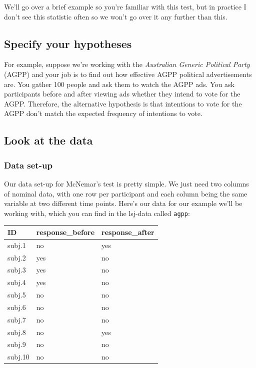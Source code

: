 \documentclass[
]{book}
\begin{document}
We'll go over a brief example so you're familiar with this test, but in practice I don't see this statistic often so we won't go over it any further than this.

\hypertarget{specify-your-hypotheses-3}{%
\subsection{Specify your hypotheses}\label{specify-your-hypotheses-3}}

For example, suppose we're working with the \emph{Australian Generic Political Party} (AGPP) and your job is to find out how effective AGPP political advertisements are. You gather 100 people and ask them to watch the AGPP ads. You ask participants before and after viewing ads whether they intend to vote for the AGPP. Therefore, the alternative hypothesis is that intentions to vote for the AGPP don't match the expected frequency of intentions to vote.

\hypertarget{look-at-the-data-5}{%
\subsection{Look at the data}\label{look-at-the-data-5}}

\hypertarget{data-set-up-5}{%
\subsubsection{Data set-up}\label{data-set-up-5}}

Our data set-up for McNemar's test is pretty simple. We just need two columns of nominal data, with one row per participant and each column being the same variable at two different time points. Here's our data for our example we'll be working with, which you can find in the lsj-data called \texttt{agpp}:

\begin{longtable}[]{@{}lll@{}}
\toprule
ID & response\_before & response\_after \\
\midrule
\endhead
subj.1 & no & yes \\
subj.2 & yes & no \\
subj.3 & yes & no \\
subj.4 & yes & no \\
subj.5 & no & no \\
subj.6 & no & no \\
subj.7 & no & no \\
subj.8 & no & yes \\
subj.9 & no & no \\
subj.10 & no & no \\
\bottomrule
\end{longtable}
\end{document}
